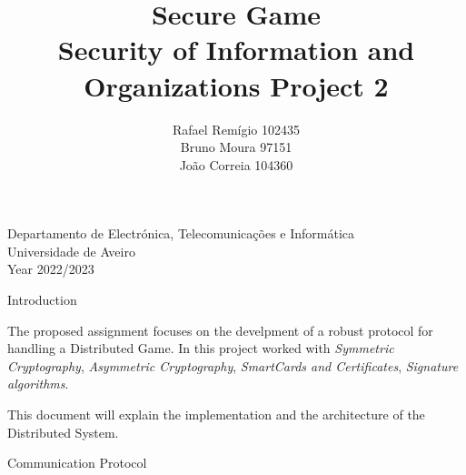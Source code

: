 \documentclass[11pt]{article}
\begin{document}
\begin{titlepage}

\title{%
  Secure Game \\
  \large  Security of Information and Organizations Project 2\\}

\author{Rafael Remígio 102435 \\ Bruno Moura 97151\\ João Correia 104360}

\maketitle

\vfill
\begin{center}

	Departamento de Electrónica, Telecomunicações e Informática\\
       Universidade de Aveiro\\ Year 2022/2023
\end{center}



\end{titlepage}


\begin{center}
	\Huge Introduction
\end{center}


\par The proposed assignment focuses on the develpment of a robust protocol for handling a Distributed Game. In this project worked with \emph{Symmetric Cryptography}, \emph{Asymmetric Cryptography}, \emph{SmartCards and Certificates}, \emph{Signature algorithms}.
\par This document will explain the implementation and the architecture of the Distributed System.

\pagebreak


\begin{center}
	{\Huge Communication Protocol}
\end{center}
\end{document}
